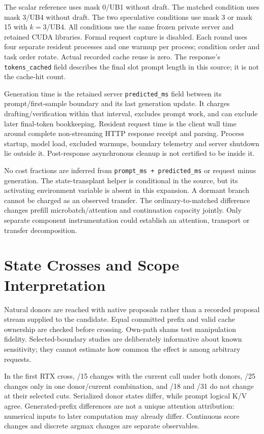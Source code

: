 \documentclass{article}
\begin{document}
The scalar reference uses mask 0/UB1 without draft. The matched condition uses mask 3/UB4 without draft. The two speculative conditions use mask 3 or mask 15 with $k=3$/UB4. All conditions use the same frozen private server and retained CUDA libraries. Formal request capture is disabled. Each round uses four separate resident processes and one warmup per process; condition order and task order rotate. Actual recorded cache reuse is zero. The response's \texttt{tokens\_cached} field describes the final slot prompt length in this source; it is not the cache-hit count.

Generation time is the retained server \texttt{predicted\_ms} field between its prompt/first-sample boundary and its last generation update. It charges drafting/verification within that interval, excludes prompt work, and can exclude later final-token bookkeeping. Resident request time is the client wall time around complete non-streaming HTTP response receipt and parsing. Process startup, model load, excluded warmups, boundary telemetry and server shutdown lie outside it. Post-response asynchronous cleanup is not certified to be inside it.

No cost fractions are inferred from \texttt{prompt\_ms + predicted\_ms} or request minus generation. The state-transplant helper is conditional in the source, but its activating environment variable is absent in this expansion. A dormant branch cannot be charged as an observed transfer. The ordinary-to-matched difference changes prefill microbatch/attention and continuation capacity jointly. Only separate component instrumentation could establish an attention, transport or transfer decomposition.

\section{State Crosses and Scope Interpretation}
Natural donors are reached with native proposals rather than a recorded proposal stream supplied to the candidate. Equal committed prefix and valid cache ownership are checked before crossing. Own-path shams test manipulation fidelity. Selected-boundary studies are deliberately informative about known sensitivity; they cannot estimate how common the effect is among arbitrary requests.

In the first RTX cross, /15 changes with the current call under both donors, /25 changes only in one donor/current combination, and /18 and /31 do not change at their selected cuts. Serialized donor states differ, while prompt logical K/V agree. Generated-prefix differences are not a unique attention attribution: numerical inputs to later computation may already differ. Continuous score changes and discrete argmax changes are separate observables.
\end{document}
